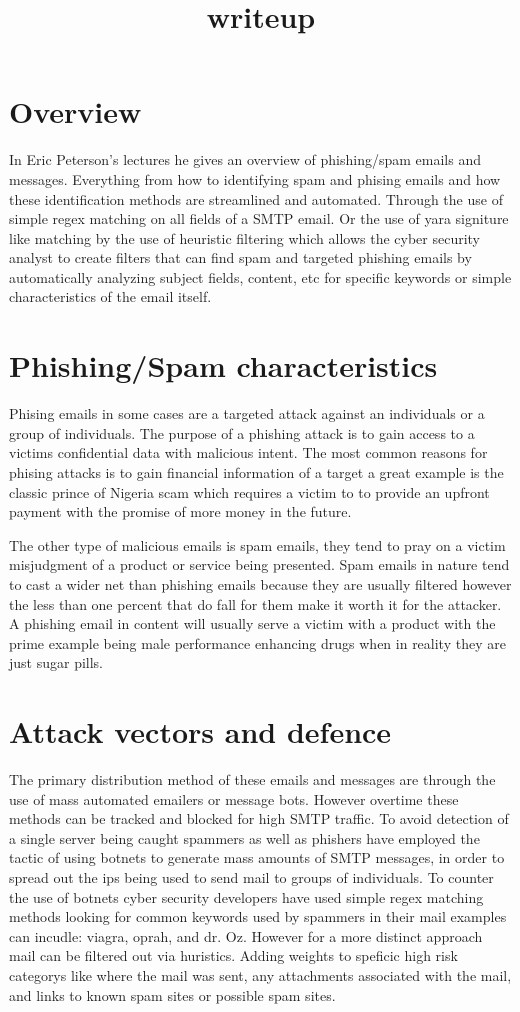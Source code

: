 \documentclass[letterpaper,12pt,titlepage,onecolumn]{IEEEtran}
\author{\name}
\title{writeup}
\begin{document}
\maketitle
\hrulefill


\section{Overview}
In Eric Peterson's lectures he gives an overview of phishing/spam emails and messages. Everything from how to identifying spam and phising emails and how these identification methods are streamlined and automated. Through the use of simple regex matching on all fields of a SMTP email. Or the use of yara signiture like matching by the use of heuristic filtering which allows the cyber security analyst to create filters that can find spam and targeted phishing emails by automatically analyzing subject fields, content, etc for specific keywords or simple characteristics of the email itself.

\section{Phishing/Spam characteristics}
Phising emails in some cases are a targeted attack against an individuals or a group of individuals. The purpose of a phishing attack is to gain access to a victims confidential data with malicious intent. The most common reasons for phising attacks is to gain financial information of a target a great example is the classic prince of Nigeria scam which requires a victim to to provide an upfront payment with the promise of more money in the future.\par
The other type of malicious emails is spam emails, they tend to pray on a victim misjudgment of a product or service being presented. Spam emails in nature tend to cast a wider net than phishing emails because they are usually filtered however the less than one percent that do fall for them make it worth it for the attacker. A phishing email in content will usually serve a victim with a product with the prime example being male performance enhancing drugs when in reality they are just sugar pills.
\section{Attack vectors and defence}
The primary distribution method of these emails and messages are through the use of mass automated emailers or message bots. However overtime these methods can be tracked and blocked for high SMTP traffic. To avoid detection of a single server being caught spammers as well as phishers have employed the tactic of using botnets to generate mass amounts of SMTP messages, in order to spread out the ips being used to send mail to groups of individuals. To counter the use of botnets cyber security developers have used simple regex matching methods looking for common keywords used by spammers in their mail examples can incudle: viagra, oprah, and dr. Oz. However for a more distinct approach mail can be filtered out via huristics. Adding weights to speficic high risk categorys like where the mail was sent, any attachments associated with the mail, and links to known spam sites or possible spam sites.
\end{document}
